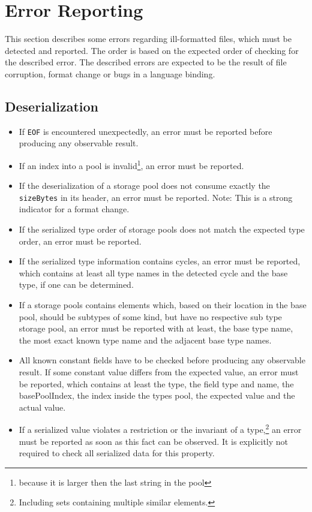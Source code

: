 \documentclass[a4paper,10pt]{article}
\begin{document}
\section{Error Reporting}

This section describes some errors regarding ill-formatted files, which must be detected and reported. The order is based on the expected order of checking for the described error. The described errors are expected to be the result of file corruption, format change or bugs in a language binding.

\subsection*{Deserialization}
\begin{itemize}
\item If \texttt{EOF} is encountered unexpectedly, an error must be reported before producing any observable result.

\item If an index into a pool is invalid\footnote{because it is larger then the last string in the pool}, an error must be reported.

\item If the deserialization of a storage pool does not consume exactly the \texttt{sizeBytes} in its header, an error must be reported. Note: This is a strong indicator for a format change.

\item If the serialized type order of storage pools does not match the expected type order, an error must be reported.

\item If the serialized type information contains cycles, an error must be reported, which contains at least all type names in the detected cycle and the base type, if one can be determined.

\item If a storage pools contains elements which, based on their location in the base pool, should be subtypes of some kind, but have no respective sub type storage pool, an error must be reported with at least, the base type name, the most exact known type name and the adjacent base type names.

\item All known constant fields have to be checked before producing any observable result. If some constant value differs from the expected value, an error must be reported, which contains at least the type, the field type and name, the basePoolIndex, the index inside the types pool, the expected value and the actual value.

\item If a serialized value violates a restriction or the invariant of a type,\footnote{Including sets containing multiple similar elements.} an error must be reported as soon as this fact can be observed. It is explicitly not required to check all serialized data for this property.
\end{itemize}
\end{document}

